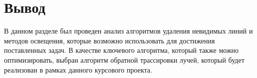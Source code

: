 \section{Вывод}
В данном разделе был проведен анализ алгоритмов удаления невидимых линий и методов освещения, которые возможно использовать для достижения поставленных задач. В качестве ключевого алгоритма, который также можно оптимизировать, выбран алгоритм обратной трассировки лучей, который будет реализован в рамках данного курсового проекта.

